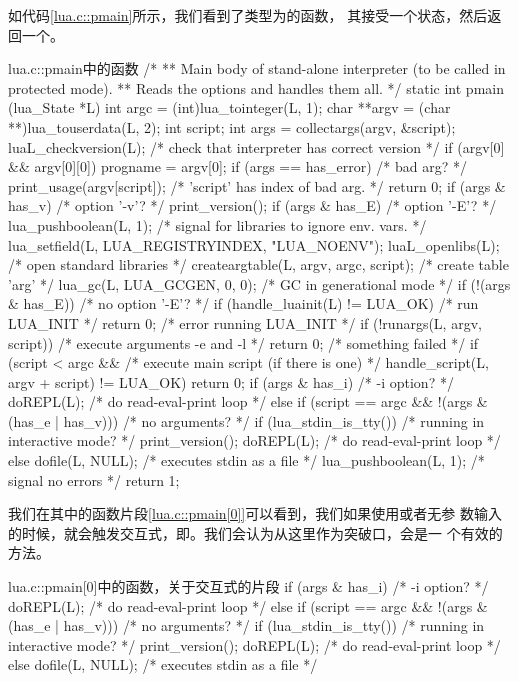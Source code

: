 如代码\ref{lua.c::pmain}所示，我们看到了类型为的函数，
其接受一个状态，然后返回一个。

\begin{ccode}{lua.c::pmain}{中的函数}
/*
** Main body of stand-alone interpreter (to be called in protected mode).
** Reads the options and handles them all.
*/
static int pmain (lua_State *L) {
  int argc = (int)lua_tointeger(L, 1);
  char **argv = (char **)lua_touserdata(L, 2);
  int script;
  int args = collectargs(argv, &script);
  luaL_checkversion(L);  /* check that interpreter has correct version */
  if (argv[0] && argv[0][0]) progname = argv[0];
  if (args == has_error) {  /* bad arg? */
    print_usage(argv[script]);  /* 'script' has index of bad arg. */
    return 0;
  }
  if (args & has_v)  /* option '-v'? */
    print_version();
  if (args & has_E) {  /* option '-E'? */
    lua_pushboolean(L, 1);  /* signal for libraries to ignore env. vars. */
    lua_setfield(L, LUA_REGISTRYINDEX, "LUA_NOENV");
  }
  luaL_openlibs(L);  /* open standard libraries */
  createargtable(L, argv, argc, script);  /* create table 'arg' */
  lua_gc(L, LUA_GCGEN, 0, 0);  /* GC in generational mode */
  if (!(args & has_E)) {  /* no option '-E'? */
    if (handle_luainit(L) != LUA_OK)  /* run LUA_INIT */
      return 0;  /* error running LUA_INIT */
  }
  if (!runargs(L, argv, script))  /* execute arguments -e and -l */
    return 0;  /* something failed */
  if (script < argc &&  /* execute main script (if there is one) */
      handle_script(L, argv + script) != LUA_OK)
    return 0;
  if (args & has_i)  /* -i option? */
    doREPL(L);  /* do read-eval-print loop */
  else if (script == argc && !(args & (has_e | has_v))) {  /* no arguments? */
    if (lua_stdin_is_tty()) {  /* running in interactive mode? */
      print_version();
      doREPL(L);  /* do read-eval-print loop */
    }
    else dofile(L, NULL);  /* executes stdin as a file */
  }
  lua_pushboolean(L, 1);  /* signal no errors */
  return 1;
}
\end{ccode}

我们在其中的函数片段\ref{lua.c::pmain[0]}可以看到，我们如果使用或者无参
数输入的时候，就会触发交互式，即。我们会认为从这里作为突破口，会是一
个有效的方法。

\begin{ccode}{lua.c::pmain[0]}{中的函数，关于交互式的片段}
  if (args & has_i)  /* -i option? */
    doREPL(L);  /* do read-eval-print loop */
  else if (script == argc && !(args & (has_e | has_v))) {  /* no arguments? */
    if (lua_stdin_is_tty()) {  /* running in interactive mode? */
      print_version();
      doREPL(L);  /* do read-eval-print loop */
    }
    else dofile(L, NULL);  /* executes stdin as a file */
  }
\end{ccode}

